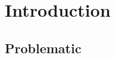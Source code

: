 \documentclass[../report.tex]{subfiles}
\begin{document}


\chapter{Introduction}


\section{Problematic}













\end{document}
